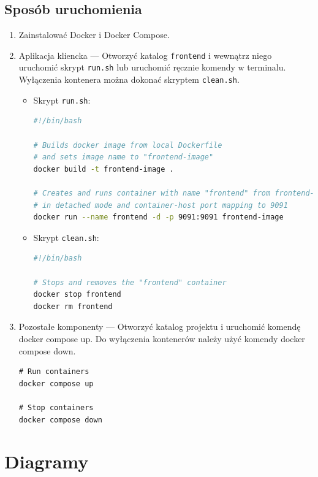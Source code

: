 \documentclass[12pt, a4paper]{report}
\begin{document}
\section{Sposób uruchomienia}
\begin{enumerate}
\item Zainstalować Docker i Docker Compose.
\item Aplikacja kliencka --- Otworzyć katalog \texttt{frontend} i wewnątrz niego uruchomić skrypt \texttt{run.sh} lub uruchomić ręcznie komendy w terminalu. Wyłączenia kontenera można dokonać skryptem \texttt{clean.sh}.
\begin{itemize}
\item Skrypt \texttt{run.sh}:
\begin{lstlisting}[language=bash]
#!/bin/bash

# Builds docker image from local Dockerfile
# and sets image name to "frontend-image"
docker build -t frontend-image .

# Creates and runs container with name "frontend" from frontend-image
# in detached mode and container-host port mapping to 9091
docker run --name frontend -d -p 9091:9091 frontend-image
\end{lstlisting}

\item Skrypt \texttt{clean.sh}:
\begin{lstlisting}[language=bash]
#!/bin/bash

# Stops and removes the "frontend" container
docker stop frontend
docker rm frontend
\end{lstlisting}

\end{itemize}
\item Pozostałe komponenty --- Otworzyć katalog projektu i uruchomić komendę docker compose up.
Do wyłączenia kontenerów należy użyć komendy docker compose down.
\begin{lstlisting}
# Run containers
docker compose up

# Stop containers
docker compose down
\end{lstlisting}
    
\end{enumerate}


\chapter{Diagramy}
\end{document}
